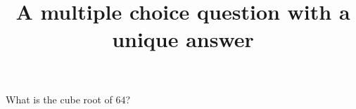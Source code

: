 \documentclass{webquiz}
\title{A multiple choice question with a unique answer}
\begin{document}
  \begin{question}     %
     What is the cube root of $64$?
     \begin{choice}[columns=3]%
     \end{choice}
  \end{question}
\end{document}

